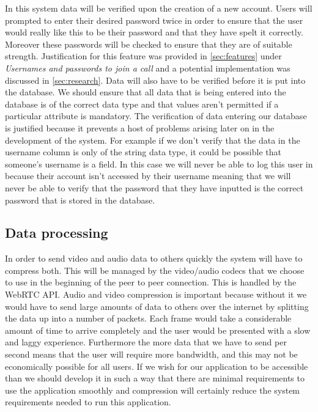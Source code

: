 In this system data will be verified upon the creation of a
new account. Users will prompted to enter their desired
password twice in order to ensure that the user would really 
like this to be their password and that they have spelt it 
correctly. Moreover these passwords will be checked to 
ensure that they are of suitable strength. Justification for 
this feature was provided in \ref{sec:features} under 
\textit{Usernames and passwords to join a call} and a
potential implementation was discussed in \ref{sec:research}.
Data will also have to be verified before it is put into the 
database. We should ensure that all data that is being entered
into the database is of the correct data type and that
 values aren't permitted if a particular 
attribute is mandatory. The verification of data entering our
database is justified because it prevents a host of problems 
arising later on in the development of the system. For example
if we don't verify that the data in the username column is 
only of the string data type, it could be possible that 
someone's username is a  field. In this case we 
will never be able to log this user in because their account
isn't accessed by their username meaning that we will never be
able to verify that the password that they have inputted is the 
correct password that is stored in the database.

\subsection{Data processing}

In order to send video and audio data to others quickly the 
system will have to compress both. This will be managed by the
video/audio codecs that we choose to use in the beginning of
the peer to peer connection. This is handled by the
WebRTC API. Audio and video compression is 
important because without it we would have to send large 
amounts of data to others over the internet by splitting the
data up into a number of packets. Each frame would take a 
considerable amount of time to arrive completely and the user
would be presented with a slow and laggy experience.
Furthermore the more data that we have to send per second 
means that the user will require more bandwidth, and this 
may not be economically possible for all users. If we wish 
for our application to be accessible than we should develop it
in such a way that there are minimal requirements to use the 
application smoothly and compression will certainly reduce the
system requirements needed to run this application.

